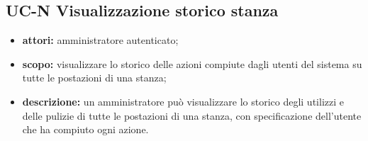 \subsection{UC-N Visualizzazione storico stanza}
\begin{itemize}
    \item \textbf{attori:} amministratore autenticato;
    \item \textbf{scopo:} visualizzare lo storico delle azioni compiute dagli utenti del sistema su tutte le postazioni di una stanza;
    \item \textbf{descrizione:} un amministratore pu\`{o} visualizzare lo storico degli utilizzi e delle pulizie di tutte le postazioni di una stanza, con specificazione dell'utente che ha compiuto ogni azione.
\end{itemize}
